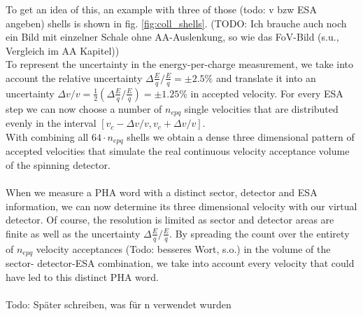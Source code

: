 To get an idea of this, an example with three of those (todo: v bzw ESA angeben) shells is shown in fig. \ref{fig:coll_shells}. (TODO: Ich brauche auch noch ein Bild mit einzelner Schale ohne AA-Auslenkung, so wie das FoV-Bild (s.u., Vergleich im AA Kapitel))\\
To represent the uncertainty in the energy-per-charge measurement, we take into account the relative uncertainty $\Delta \frac{E}{q}/\frac{E}{q} = \pm 2.5\%$ \citep{gloeckler_1992} and translate it into an uncertainty $\Delta v / v = \frac{1}{2} \left( \Delta \frac{E}{q}/\frac{E}{q}\right) = \pm 1.25\%$ in accepted velocity. For every ESA step we can now choose a number of $n_{epq}$ single velocities that are distributed evenly in the interval $\left[ v_c - \Delta v / v, v_c + \Delta v / v \right]$. %
\\
With combining all $64 \cdot n_{epq}$ shells we obtain a dense three dimensional pattern of accepted velocities that simulate the real continuous velocity acceptance volume of the spinning detector.
\\ \\
When we measure a PHA word with a distinct sector, detector and ESA information, we can now determine its three dimensional velocity with our virtual detector. Of course, the resolution is limited as sector and detector areas are finite as well as the uncertainty $\Delta \frac{E}{q}/\frac{E}{q}$. By spreading the count over the entirety of $n_{epq}$ velocity acceptances (Todo: besseres Wort, s.o.) in the volume of the sector- detector-ESA combination, we take into account every velocity that could have led to this distinct PHA word.
\\ \\
Todo: Später schreiben, was für n verwendet wurden
%
%
%
